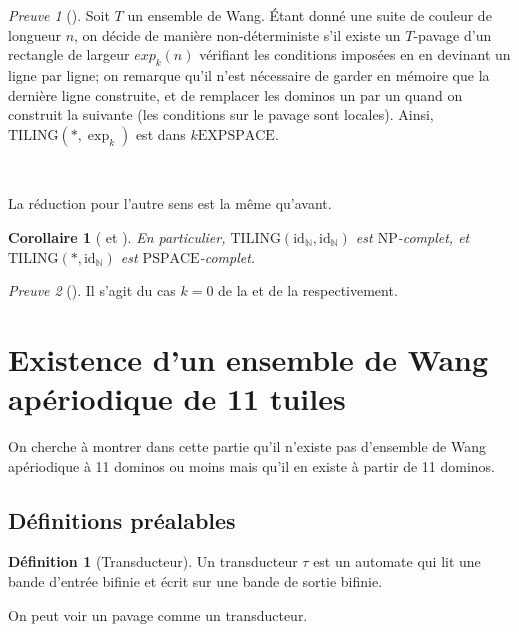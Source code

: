 \documentclass{scrartcl}
\newcommand{\N}{\mathbb N}
\newcommand{\id}{\mathrm{id}}
\newtheorem{corollaire}{Corollaire}
\theoremstyle{definition}
\newtheorem*{definition}{Définition}
\theoremstyle{remark}
\newtheorem*{preuve}{Preuve}
\begin{document}
\begin{preuve}[]
  Soit $T$ un ensemble de Wang. Étant donné une suite de couleur de longueur $n$, on décide de manière non-déterministe s'il existe un $T$-pavage d'un rectangle de largeur $exp_k(n)$ vérifiant les conditions imposées en en devinant un ligne par ligne; on remarque qu'il n'est nécessaire de garder en mémoire que la dernière ligne construite, et de remplacer les dominos un par un quand on construit la suivante (les conditions sur le pavage sont locales). Ainsi, $\mathrm{TILING}(*,\exp_k)$ est dans $k\mathrm{EXPSPACE}$.

  \

  La réduction pour l'autre sens est la même qu'avant.
\end{preuve}

\begin{corollaire}[ et ]
  En particulier, $\mathrm{TILING}(\id_\N,\id_\N)$ est $\mathrm{NP}$-complet, et $\mathrm{TILING}(*,\id_\N)$ est $\mathrm{PSPACE}$-complet. 
\end{corollaire}

\begin{preuve}[]
  Il s'agit du cas $k=0$ de la  et de la  respectivement.
\end{preuve}

\section{Existence d'un ensemble de Wang apériodique de 11 tuiles}

On cherche à montrer dans cette partie qu'il n'existe pas d'ensemble de Wang apériodique à 11 dominos ou moins
mais qu'il en existe à partir de 11 dominos.

\subsection{Définitions préalables}

\begin{definition}[Transducteur]
    
Un transducteur $\tau$ est un automate qui lit une bande d'entrée bifinie et écrit sur une bande de sortie bifinie.

\end{definition}

On peut voir un pavage comme un transducteur.
\end{document}
